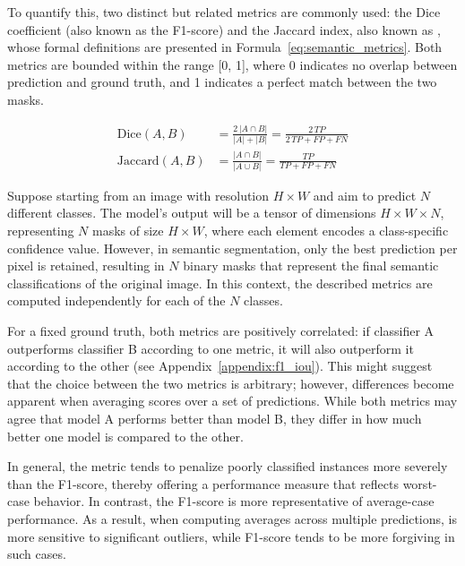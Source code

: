 To quantify this, two distinct but related metrics are commonly used: the Dice coefficient (also known as the F1-score) and the Jaccard index, also known as , whose formal definitions are presented in Formula~\ref{eq:semantic_metrics}. Both metrics are bounded within the range [0, 1], where 0 indicates no overlap between prediction and ground truth, and 1 indicates a perfect match between the two masks.

\begin{equation}
    \begin{aligned}
    \text{Dice}(A, B) &= \frac{2\,|A \cap B|}{|A| + |B|} = \frac{2\,TP}{2\,TP + FP + FN} \\
    \text{Jaccard}(A, B)  &= \frac{|A \cap B|}{|A \cup B|} = \frac{TP}{TP + FP + FN}
    \end{aligned}
    \label{eq:semantic_metrics}
\end{equation}

Suppose starting from an image with resolution $H \times W$ and aim to predict $N$ different classes. The model's output will be a tensor of dimensions $H \times W \times N$, representing $N$ masks of size $H \times W$, where each element encodes a class-specific confidence value. However, in semantic segmentation, only the best prediction per pixel is retained, resulting in $N$ binary masks that represent the final semantic classifications of the original image. In this context, the described metrics are computed independently for each of the $N$ classes.

For a fixed ground truth, both metrics are positively correlated: if classifier A outperforms classifier B according to one metric, it will also outperform it according to the other (see Appendix~\ref{appendix:f1_iou}). This might suggest that the choice between the two metrics is arbitrary; however, differences become apparent when averaging scores over a set of predictions. While both metrics may agree that model A performs better than model B, they differ in how much better one model is compared to the other.

In general, the  metric tends to penalize poorly classified instances more severely than the F1-score, thereby offering a performance measure that reflects worst-case behavior. In contrast, the F1-score is more representative of average-case performance. As a result, when computing averages across multiple predictions,  is more sensitive to significant outliers, while F1-score tends to be more forgiving in such cases.

